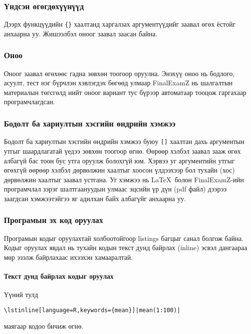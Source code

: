 \documentclass[10pt]{article}
\theoremstyle{definition}
\begin{document}
\subsubsection{Үндсэн өгөгдөхүүнүүд} Дээрх функцүүдийн \texttt{\{\}} хаалтанд харгалзах аргументүүдийг заавал өгөх ёстойг анхаарна уу. Жишээлбэл оноог заавал заасан байна. 

\subsubsection{Оноо} Оноог заавал өгөхөөс гадна зөвхөн тоогоор оруулна. Энэхүү оноо нь бодлого, асуулт, тест нэг бүрчлэн хэвлэгдэх бөгөөд улмаар FinalExamZ нь шалгалтын материалын төгсгөлд нийт оноог вариант тус бүрээр автоматаар тооцож гаргахаар програмчлагдсан.

\subsubsection{Бодолт ба хариултын хэсгийн өндрийн хэмжээ} Бодолт ба хариултын хэсгийн өндрийн хэмжээ буюу \texttt{[]} хаалтан дахь аргументын утгыг шаардлагатай үедээ зөвхөн тоогоор өгнө. Өөрөөр хэлбэл заавал зааж өгөх албагүй бас тоон бус утга оруулж болохгүй юм. Хэрвээ уг аргументийн утгыг өгөхгүй өөрөөр хэлбэл дөрвөлжин хаалтыг хоосон үлдээхээр бол тухайн (хос) дөрвөлжин хаалтыг заавал устгана. Уг хэмжээ нь \LaTeX\ болон FinalExamZ-ийн програмчлал зэрэг шалтгаануудын улмаас эцсийн үр дүн (pdf файл) дээрээ заагдсан хэмжээтэйгээ яг адилхан байх албагүйг анхаарна уу.

\subsubsection{Програмын эх код оруулах} Програмын кодыг оруулахтай холбоотойгоор listings багцыг санал болгож байна. Кодыг оруулах явдал нь тухайн кодын текст дунд байрлах (inline) эсвэл дангаараа мөр эзэлж байрлахаас ихээхэн хамааралтай.

\paragraph{Текст дунд байрлах кодыг оруулах} Үүний тулд
\begin{verbatim}
\lstinline[language=R,keywords={mean}]|mean(1:100)|
\end{verbatim}
маягаар кодоо бичиж өгнө.
\end{document}

